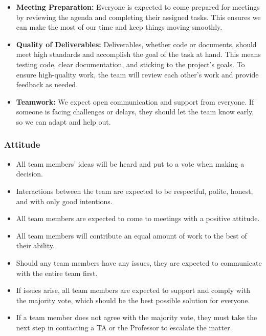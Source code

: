 \documentclass{article}
\begin{document}
\begin{itemize}
    \item \textbf{Meeting Preparation:}  
    Everyone is expected to come prepared for meetings by reviewing the agenda and completing their assigned tasks. This ensures we can make the most of our time and keep things moving smoothly.

    \item \textbf{Quality of Deliverables:}  
    Deliverables, whether code or documents, should meet high standards and accomplish the goal of the task at hand. This means testing code, clear documentation, and sticking to the project's goals. To ensure high-quality work, the team will review each other's work and provide feedback as needed.

    \item \textbf{Teamwork:}  
    We expect open communication and support from everyone. If someone is facing challenges or delays, they should let the team know early, so we can adapt and help out.
\end{itemize}

\subsubsection*{Attitude}

\begin{itemize}
    \item All team members’ ideas will be heard and put to a vote when making a decision.
    \item Interactions between the team are expected to be respectful, polite, honest, and with only good intentions.
    \item All team members are expected to come to meetings with a positive attitude.
    \item All team members will contribute an equal amount of work to the best of their ability.
    \item Should any team members have any issues, they are expected to communicate with the entire team first.
    \item If issues arise, all team members are expected to support and comply with the majority vote, which should be the best possible solution for everyone.
    \item If a team member does not agree with the majority vote, they must take the next step in contacting a TA or the Professor to escalate the matter.
\end{itemize}
\end{document}
